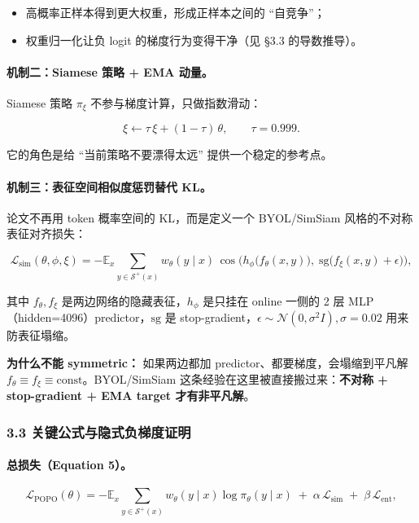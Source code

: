 \begin{itemize}[leftmargin=1.5em]
  \item 高概率正样本得到更大权重，形成正样本之间的 ``自竞争''；
  \item 权重归一化让负 logit 的梯度行为变得干净（见 §3.3 的导数推导）。
\end{itemize}

\paragraph{机制二：Siamese 策略 + EMA 动量。}
Siamese 策略 $\pi_\xi$ 不参与梯度计算，只做指数滑动：

\[
\xi\leftarrow\tau\,\xi + (1-\tau)\,\theta,\qquad \tau=0.999.
\]

它的角色是给 ``当前策略不要漂得太远'' 提供一个稳定的参考点。

\paragraph{机制三：表征空间相似度惩罚替代 KL。}
论文不再用 token 概率空间的 KL，而是定义一个 BYOL/SimSiam 风格的不对称表征对齐损失：

\[
\mathcal{L}_{\text{sim}}(\theta,\phi,\xi)
=
-\mathbb{E}_x\!\!\sum_{y\in\mathcal{S}^{+}(x)}\!\!w_\theta(y\mid x)\,
\cos\!\Big(h_\phi\big(f_\theta(x,y)\big),\;\mathrm{sg}\big(f_\xi(x,y)+\epsilon\big)\Big),
\]

其中 $f_\theta,f_\xi$ 是两边网络的隐藏表征，$h_\phi$ 是只挂在 online 一侧的 2 层 MLP（hidden=4096）predictor，$\mathrm{sg}$ 是 stop-gradient，$\epsilon\sim\mathcal{N}(0,\sigma^2 I),\sigma=0.02$ 用来防表征塌缩。

\begin{warnbox}
\textbf{为什么不能 symmetric：} 如果两边都加 predictor、都要梯度，会塌缩到平凡解 $f_\theta\equiv f_\xi\equiv\text{const}$。BYOL/SimSiam 这条经验在这里被直接搬过来：\textbf{不对称 + stop-gradient + EMA target 才有非平凡解}。
\end{warnbox}

\subsubsection{3.3 关键公式与隐式负梯度证明}

\paragraph{总损失（Equation 5）。}
\[
\mathcal{L}_{\text{POPO}}(\theta)
=
-\mathbb{E}_{x}\!\!\sum_{y\in\mathcal{S}^{+}(x)}\!\!w_\theta(y\mid x)\log\pi_\theta(y\mid x)
\;+\;\alpha\,\mathcal{L}_{\text{sim}}
\;+\;\beta\,\mathcal{L}_{\text{ent}},
\]

